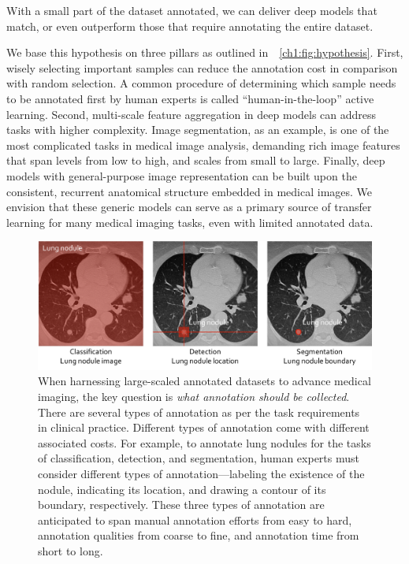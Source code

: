 \bigskip\bigskip
\begin{tcolorbox}
With a small part of the dataset annotated, we can deliver deep models that match, or even outperform those that require annotating the entire dataset.
\end{tcolorbox}


We base this hypothesis on three pillars as outlined in~\figurename~\ref{ch1:fig:hypothesis}. First, wisely selecting important samples can reduce the annotation cost in comparison with random selection. A common procedure of determining which sample needs to be annotated first by human experts is called ``human-in-the-loop'' active learning. Second, multi-scale feature aggregation in deep models can address tasks with higher complexity. Image segmentation, as an example, is one of the most complicated tasks in medical image analysis, demanding rich image features that span levels from low to high, and scales from small to large. Finally, deep models with general-purpose image representation can be built upon the consistent, recurrent anatomical structure embedded in medical images. We envision that these generic models can serve as a primary source of transfer learning for many medical imaging tasks, even with limited annotated data. 


\begin{figure}[t]
\begin{center}
\includegraphics[width=1.0\linewidth]{Figures/CH1/fig_annotation_types.pdf}
\end{center}
\caption[What Is Annotation?]{
When harnessing large-scaled annotated datasets to advance medical imaging, the key question is \textit{what annotation should be collected}. There are several types of annotation as per the task requirements in clinical practice. Different types of annotation come with different associated costs. 
For example, to annotate lung nodules for the tasks of classification, detection, and segmentation, human experts must consider different types of annotation---labeling the existence of the nodule, indicating its location, and drawing a contour of its boundary, respectively. 
These three types of annotation are anticipated to span manual annotation efforts from easy to hard, annotation qualities from coarse to fine, and annotation time from short to long.}
\label{ch1:fig:annotation_types}
\end{figure}


